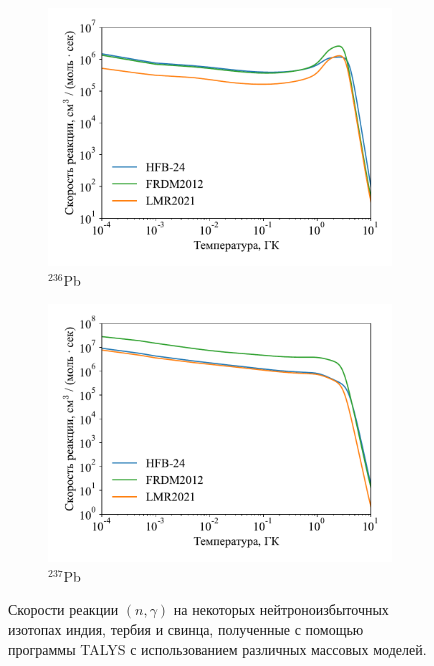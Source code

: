 \begin{figure}
\begin{subfigure}{0.48\textwidth}
    \centering
    \includegraphics[width=\textwidth]{../pics/rate_pb236.pdf}
    \caption{${}^{236}$Pb}
    \label{fig:ng_rate:236pb}
  \end{subfigure}
  \hfil
  \begin{subfigure}{0.48\textwidth}
    \centering
    \includegraphics[width=\textwidth]{../pics/rate_pb237.pdf}
    \caption{${}^{237}$Pb}
    \label{fig:ng_rate:237pb}
  \end{subfigure}
  \caption{Скорости реакции $(n,\gamma)$ на некоторых нейтроноизбыточных изотопах индия, тербия и свинца, полученные с помощью программы TALYS с использованием различных массовых моделей.}
  \label{fig:ng_rate}
\end{figure}

